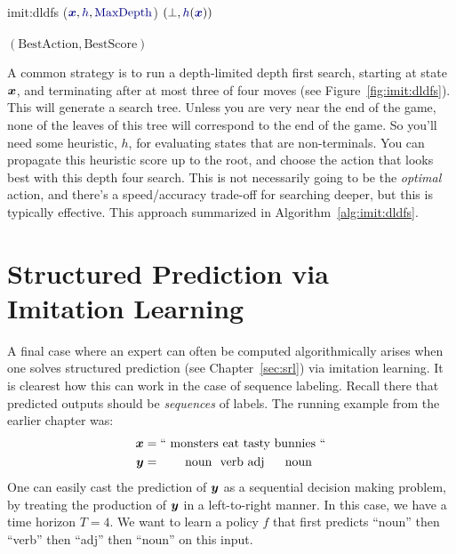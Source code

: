 \newalgorithm%
  {imit:dldfs}%
  {($\VARm{\vx}, \VARm{h}, \VARm{\text{MaxDepth}}$)}
  {
      \RETURN $(\bot, \VARm{h}(\VARm{\vx}))$
      \\
    \ELSE
        \\
        \ENDIF
      \ENDFOR
    \ENDIF
    \RETURN $(\text{BestAction}, \text{BestScore})$
  }


A common strategy is to run a depth-limited depth first search, starting at state ${\boldsymbol{x}}$, and terminating after at most three of four moves (see Figure~\ref{fig:imit:dldfs}).
This will generate a search tree.
Unless you are very near the end of the game, none of the leaves of this tree will correspond to the end of the game.
So you'll need some heuristic, $h$, for evaluating states that are non-terminals.
You can propagate this heuristic score up to the root, and choose the action that looks best with this depth four search.
This is not necessarily going to be the \emph{optimal} action, and there's a speed/accuracy trade-off for searching deeper, but this is typically effective.
This approach summarized in Algorithm~\ref{alg:imit:dldfs}.


\section{Structured Prediction via Imitation Learning}

A final case where an expert can often be computed algorithmically arises when one solves structured prediction (see Chapter~\ref{sec:srl}) via imitation learning.
It is clearest how this can work in the case of sequence labeling.
Recall there that predicted outputs should be \emph{sequences} of labels.
The running example from the earlier chapter was:
%
\begin{align}
  {\boldsymbol{x}} &= \text{`` monsters eat tasty bunnies ``} \\
  {\boldsymbol{y}} &= \text{~~~~~~noun~~verb~adj~~~~~noun}
\end{align}
%
One can easily cast the prediction of ${\boldsymbol{y}}$ as a sequential decision making problem, by treating the production of ${\boldsymbol{y}}$ in a left-to-right manner.
In this case, we have a time horizon $T=4$.
We want to learn a policy $f$ that first predicts ``noun'' then ``verb'' then ``adj'' then ``noun'' on this input.

